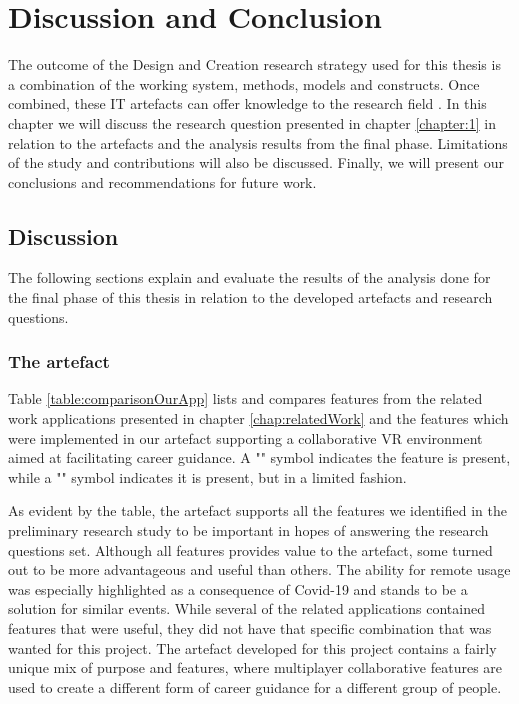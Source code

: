 
\chapter{Discussion and Conclusion}
The outcome of the Design and Creation research strategy used for this thesis is a combination of the working system, methods, models and constructs. Once combined, these IT artefacts can offer knowledge to the research field \cite{oates2005researching}. In this chapter we will discuss the research question presented in chapter \ref{chapter:1} in relation to the artefacts and the analysis results from the final phase. Limitations of the study and contributions will also be discussed.
Finally, we will present our conclusions and recommendations for future work.



\section{Discussion}
The following sections explain and evaluate the results of the analysis done for the final phase of this thesis in relation to the developed artefacts and research questions.

\subsection{The artefact} 
Table \ref{table:comparisonOurApp} lists and compares features from the related work applications presented in chapter \ref{chap:relatedWork} and the features which were implemented in our artefact supporting a collaborative VR environment aimed at facilitating career guidance. A "\ON" symbol indicates the feature is present, while a "\LIM" symbol indicates it is present, but in a limited fashion.

As evident by the table, the artefact supports all the features we identified in the preliminary research study to be important in hopes of answering the research questions set. Although all features provides value to the artefact, some turned out to be more advantageous and useful than others. The ability for remote usage was especially highlighted as a consequence of Covid-19 and stands to be a solution for similar events. While several of the related applications contained features that were useful, they did not have that specific combination that was wanted for this project. The artefact developed for this project contains a fairly unique mix of purpose and features, where multiplayer collaborative features are used to create a different form of career guidance for a different group of people. 

